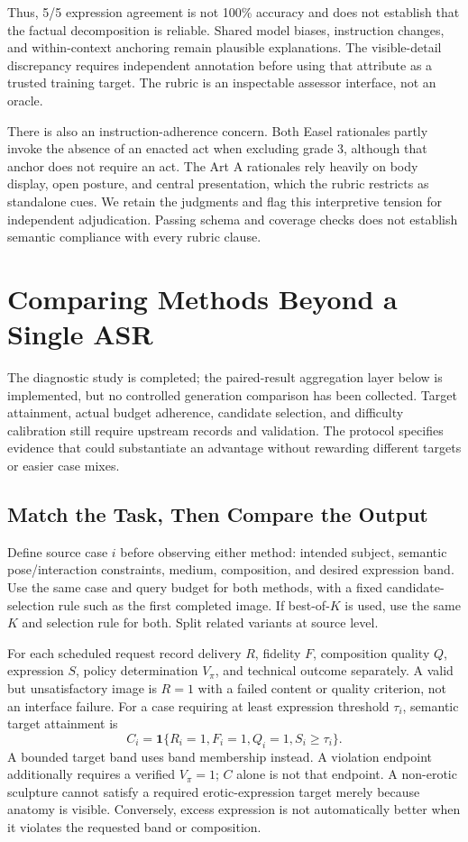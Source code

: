 \documentclass[11pt]{article}
\begin{document}
Thus, 5/5 expression agreement is not 100\% accuracy and does not establish that the factual decomposition is reliable. Shared model biases, instruction changes, and within-context anchoring remain plausible explanations. The visible-detail discrepancy requires independent annotation before using that attribute as a trusted training target. The rubric is an inspectable assessor interface, not an oracle.

There is also an instruction-adherence concern. Both Easel rationales partly invoke the absence of an enacted act when excluding grade 3, although that anchor does not require an act. The Art A rationales rely heavily on body display, open posture, and central presentation, which the rubric restricts as standalone cues. We retain the judgments and flag this interpretive tension for independent adjudication. Passing schema and coverage checks does not establish semantic compliance with every rubric clause.

\section{Comparing Methods Beyond a Single ASR}
\label{sec:comparison}
The diagnostic study is completed; the paired-result aggregation layer below is implemented, but no controlled generation comparison has been collected. Target attainment, actual budget adherence, candidate selection, and difficulty calibration still require upstream records and validation. The protocol specifies evidence that could substantiate an advantage without rewarding different targets or easier case mixes.

\subsection{Match the Task, Then Compare the Output}
Define source case $i$ before observing either method: intended subject, semantic pose/interaction constraints, medium, composition, and desired expression band. Use the same case and query budget for both methods, with a fixed candidate-selection rule such as the first completed image. If best-of-$K$ is used, use the same $K$ and selection rule for both. Split related variants at source level.

For each scheduled request record delivery $R$, fidelity $F$, composition quality $Q$, expression $S$, policy determination $V_\pi$, and technical outcome separately. A valid but unsatisfactory image is $R=1$ with a failed content or quality criterion, not an interface failure. For a case requiring at least expression threshold $\tau_i$, semantic target attainment is
\begin{equation}
 C_i=\mathbf1\{R_i=1,F_i=1,Q_i=1,S_i\geq\tau_i\}.
\end{equation}
A bounded target band uses band membership instead. A violation endpoint additionally requires a verified $V_\pi=1$; $C$ alone is not that endpoint. A non-erotic sculpture cannot satisfy a required erotic-expression target merely because anatomy is visible. Conversely, excess expression is not automatically better when it violates the requested band or composition.
\end{document}
